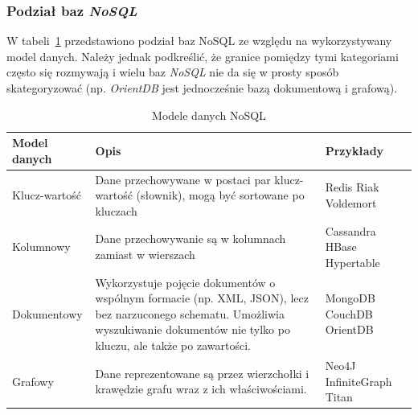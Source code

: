 
\subsubsection{Podział baz  \emph{NoSQL}}
\label{sec:podzialBazNoSQL}

W tabeli~\ref{table:noSQLdataModels} przedstawiono podział baz NoSQL ze względu na wykorzystywany model danych. Należy jednak podkreślić, że granice pomiędzy tymi kategoriami często się rozmywają i wielu baz \emph{NoSQL} nie da się w prosty sposób skategoryzować (np. \emph{OrientDB} jest jednocześnie bazą dokumentową i grafową).

\begin{table}[htbp]
\caption{Modele danych NoSQL}
\label{table:noSQLdataModels}
\begin{center}
    \begin{tabular}{ p{3cm} p{8cm} p{2cm} }
    \hline
    \textbf{Model danych} & \textbf{Opis} & \textbf{Przykłady} \\ \hline
    Klucz-wartość & Dane przechowywane w postaci par klucz-wartość (słownik), mogą być sortowane po kluczach &  Redis \newline Riak \newline Voldemort \\ \hline
    Kolumnowy & Dane przechowywanie są w kolumnach zamiast w wierszach &  Cassandra \newline HBase \newline Hypertable \\ \hline
    Dokumentowy & Wykorzystuje pojęcie dokumentów o wspólnym formacie (np. XML, JSON), lecz bez narzuconego schematu. Umożliwia wyszukiwanie dokumentów nie tylko po kluczu, ale także po zawartości. &  MongoDB \newline CouchDB \newline OrientDB \\ \hline
    Grafowy & Dane reprezentowane są przez wierzchołki i krawędzie grafu wraz z ich właściwościami. &  Neo4J \newline InfiniteGraph \newline Titan \\ \hline
    \end{tabular}
\end{center}
\end{table}


